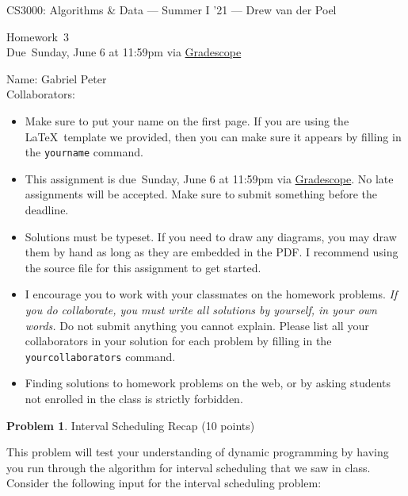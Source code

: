 \documentclass[11pt]{article}
\newcommand{\yourname}{Gabriel Peter}
\newcommand{\yourcollaborators}{}
\theoremstyle{definition}
\newcommand{\instructor}{Drew van der Poel}
\newcommand{\hwnum}{3}
\newcommand{\hwdue}{Sunday, June 6 at 11:59pm via \href{https://gradescope.com/courses/266585}{Gradescope}}
\theoremstyle{theorem}
\newtheorem{prob}{Problem}
\begin{document}
{\Large 
\begin{center}{CS3000: Algorithms \& Data} --- Summer I '21 --- \instructor \end{center}}
{\large
\vspace{10pt}
\noindent Homework~\hwnum \vspace{2pt}\\
Due~\hwdue}

\bigskip
{\large
\noindent Name: \yourname \vspace{2pt}\\ Collaborators: \yourcollaborators}

\vspace{15pt}
\begin{itemize}

\item Make sure to put your name on the first page.  If you are using the \LaTeX~template we provided, then you can make sure it appears by filling in the \texttt{yourname} command.

\item This assignment is due~\hwdue.  No late assignments will be accepted.  Make sure to submit something before the deadline.

\item Solutions must be typeset.  If you need to draw any diagrams, you may draw them by hand as long as they are embedded in the PDF.  I recommend using the source file for this assignment to get started.

\item I encourage you to work with your classmates on the homework problems. \emph{If you do collaborate, you must write all solutions by yourself, in your own words.}  Do not submit anything you cannot explain.  Please list all your collaborators in your solution for each problem by filling in the \texttt{yourcollaborators} command.

\item Finding solutions to homework problems on the web, or by asking students not enrolled in the class is strictly forbidden.

\end{itemize}



\newpage

\begin{prob}Interval Scheduling Recap (10 points) \end{prob}
This problem will test your understanding of dynamic programming by having you run through the algorithm for interval scheduling that we saw in class.  Consider the following input for the interval scheduling problem:
\end{document}
